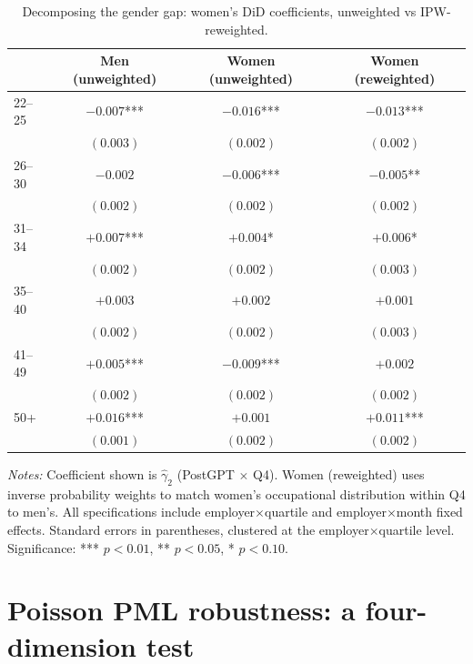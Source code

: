 \documentclass[preprint,12pt,authoryear]{elsarticle}
\begin{document}
\begin{table}[htbp]
\centering
\caption{Decomposing the gender gap: women's DiD coefficients, unweighted vs IPW-reweighted.}
\label{tab:gender_reweighted}
\footnotesize
\begin{tabular}{@{}lccc@{}}
\toprule
 & Men (unweighted) & Women (unweighted) & Women (reweighted) \\
\midrule
22--25 & $-0.007$*** & $-0.016$*** & $-0.013$*** \\
 & $(0.003)$ & $(0.002)$ & $(0.002)$ \\[4pt]
26--30 & $-0.002$ & $-0.006$*** & $-0.005$** \\
 & $(0.002)$ & $(0.002)$ & $(0.002)$ \\[4pt]
31--34 & $+0.007$*** & $+0.004$* & $+0.006$* \\
 & $(0.002)$ & $(0.002)$ & $(0.003)$ \\[4pt]
35--40 & $+0.003$ & $+0.002$ & $+0.001$ \\
 & $(0.002)$ & $(0.002)$ & $(0.003)$ \\[4pt]
41--49 & $+0.005$*** & $-0.009$*** & $+0.002$ \\
 & $(0.002)$ & $(0.002)$ & $(0.002)$ \\[4pt]
50+ & $+0.016$*** & $+0.001$ & $+0.011$*** \\
 & $(0.001)$ & $(0.002)$ & $(0.002)$ \\
\bottomrule
\end{tabular}
\par\medskip
\noindent\parbox{\linewidth}{\raggedright\scriptsize \emph{Notes:} Coefficient shown is $\hat\gamma_2$ (PostGPT $\times$ Q4). Women (reweighted) uses inverse probability weights to match women's occupational distribution within Q4 to men's. All specifications include employer$\times$quartile and employer$\times$month fixed effects. Standard errors in parentheses, clustered at the employer$\times$quartile level. Significance: *** $p<0.01$, ** $p<0.05$, * $p<0.10$.}
\end{table}


\section{Poisson PML robustness: a four-dimension test}
\label{sec:poisson_kauhanen}
\end{document}
